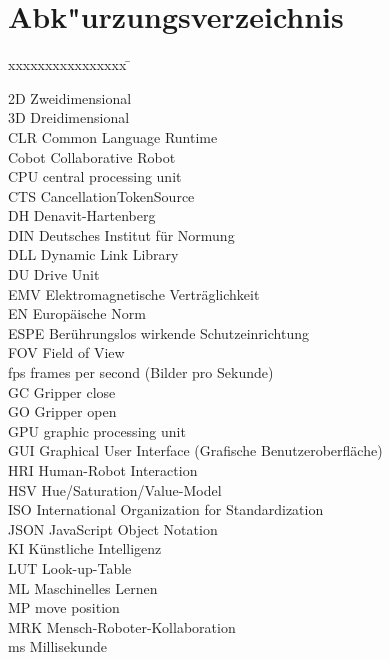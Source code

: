 \documentclass[12pt,a4paper]{report}
\begin{document}
\chapter*{Abk"urzungsverzeichnis}
\begin{tabbing}
	
	xxxxxxxxxxxxxxxx \= \kill 
	
	2D \> Zweidimensional \\
	3D \> Dreidimensional \\
	CLR \> Common Language Runtime \\
	Cobot \> Collaborative Robot \\
	CPU \> central processing unit\\
	CTS \> CancellationTokenSource \\
	DH \> Denavit-Hartenberg \\
	DIN \> Deutsches Institut für Normung \\
	DLL \> Dynamic Link Library \\
	DU \> Drive Unit \\
	EMV \> Elektromagnetische Verträglichkeit\\
	EN \> Europäische Norm \\
	ESPE \> Berührungslos wirkende Schutzeinrichtung \\
	FOV \> Field of View \\
	fps \> frames per second (Bilder pro Sekunde) \\
	GC \> Gripper close\\
	GO \> Gripper open\\
	GPU \> graphic processing unit\\
	GUI \> Graphical User Interface (Grafische Benutzeroberfläche) \\
	HRI \> Human-Robot Interaction \\
	HSV \> Hue/Saturation/Value-Model\\
	ISO \> International Organization for Standardization \\
	JSON \> JavaScript Object Notation \\
	KI \> Künstliche Intelligenz \\
	LUT \> Look-up-Table\\
	ML \> Maschinelles Lernen \\
	MP \> move position\\
	MRK \> Mensch-Roboter-Kollaboration \\
	ms \> Millisekunde \\

\end{tabbing}
\end{document}
